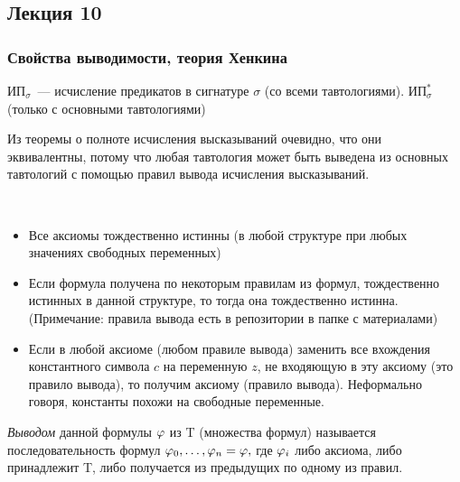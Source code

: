 \subsection{Лекция 10}

\subsubsection{Свойства выводимости, теория Хенкина}


\begin{definition}
    $\text{ИП}_\sigma$~— исчисление предикатов в сигнатуре $\sigma$ (со всеми тавтологиями). $\text{ИП}^*_\sigma$ (только с основными тавтологиями)
\end{definition}

Из теоремы о полноте исчисления высказываний очевидно, что они эквивалентны, потому что любая тавтология может быть выведена из основных тавтологий с помощью правил вывода исчисления высказываний.

\begin{stat}\
    \begin{itemize}
        \item Все аксиомы тождественно истинны (в любой структуре при любых значениях свободных переменных)
        \item Если формула получена по некоторым правилам из формул, тождественно истинных в данной структуре, то тогда она тождественно истинна. (Примечание: правила вывода есть в репозитории в папке с материалами)
        \item Если в любой аксиоме (любом правиле вывода) заменить все вхождения константного символа $c$ на переменную $z$, не входяющую в эту аксиому (это правило вывода), то получим аксиому (правило вывода). Неформально говоря, константы похожи на свободные переменные.
    \end{itemize}
\end{stat}

\begin{definition}
    \emph{Выводом} данной формулы $\varphi$ из T (множества формул) называется последовательность формул 
    $\varphi_0, \dots, \varphi_n = \varphi,$
    где $\varphi_i$ либо аксиома, либо принадлежит T, либо получается из предыдущих по одному из правил. 
\end{definition}

